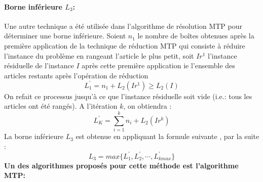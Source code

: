 \documentclass[class=report, crop=false]{standalone}
\begin{document}
    \paragraph{Borne inférieure  \(L_3\): \cite{martello1990lower}}
    Une autre technique a été utilisée dans l’algorithme de résolution MTP pour déterminer une borne inférieure.
    Soient \(n_1\) le nombre de boîtes obtenues après la première application de la technique de réduction MTP qui consiste à réduire l’instance du problème en rangeant l’article le plus petit, soit \(Ir^1\) l’instance résiduelle de l’instance \(I\) après cette première application ie l’ensemble des articles restants après l’opération de réduction
    \[L^\prime_1=n_1+L_2(Ir^1) \ge L_2(I)\]
    On refait ce processus jusqu'à ce que l’instance résiduelle soit vide (i.e.: tous les articles ont été rangés). A l’itération \(k\), on obtiendra :
    \[L^\prime_K= \displaystyle\sum_{i=1}^{k} n_i + L_2(Ir^k)\] 
    La borne inférieure \(L_3\) est obtenue en appliquant la formule suivante , par la suite :
    \[L_3=max \{L^\prime_1, L^\prime_2,\cdots,L^\prime_{kmax}\}\]
    \textbf{Un des algorithmes proposés pour cette méthode est l’algorithme MTP:} 
\end{document}
